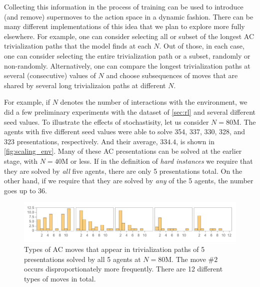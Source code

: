 Collecting this information in the process of training can be used to introduce (and remove) supermoves to the action space in a dynamic fashion. There can be many different implementations of this idea that we plan to explore more fully elsewhere. For example, one can consider selecting all or subset of the longest AC trivialization paths that the model finds at each $N$. Out of those, in each case, one can consider selecting the entire trivialization path or a subset, randomly or non-randomly. Alternatively, one can compare the longest trivialization paths at several (consecutive) values of $N$ and choose subsequences of moves that are shared by several long trivializaion paths at different $N$.

For example, if $N$ denotes the number of interactions with the environment, we did a few preliminary experiments with the dataset of \autoref{sec:rl} and several different seed values. To illustrate the effects of stochastisity, let us consider $N=80$M. The agents with five different seed values were able to solve 354, 337, 330, 328, and 323 presentations, respectively. And their average, $334.4$, is shown in \autoref{fig:scaling_env}. Many of these AC presentations can be solved at the earlier stage, with $N=40$M or less. If in the definition of \textit{hard instances} we require that they are solved by \textit{all} five agents, there are only 5 presentations total. On the other hand, if we require that they are solved by \textit{any} of the 5 agents, the number goes up to 36.

\begin{figure}[h]
    \centering
	\includegraphics[scale=0.6]{fig/anatomy_all.png}
	\caption{Types of AC moves that appear in trivialization paths of 5 presentations solved by all 5 agents at $N=80$M. The move $\# 2$ occurs disproportionately more frequently. There are 12 different types of moves in total.}
	\label{fig:anatomy_all}
\end{figure}

